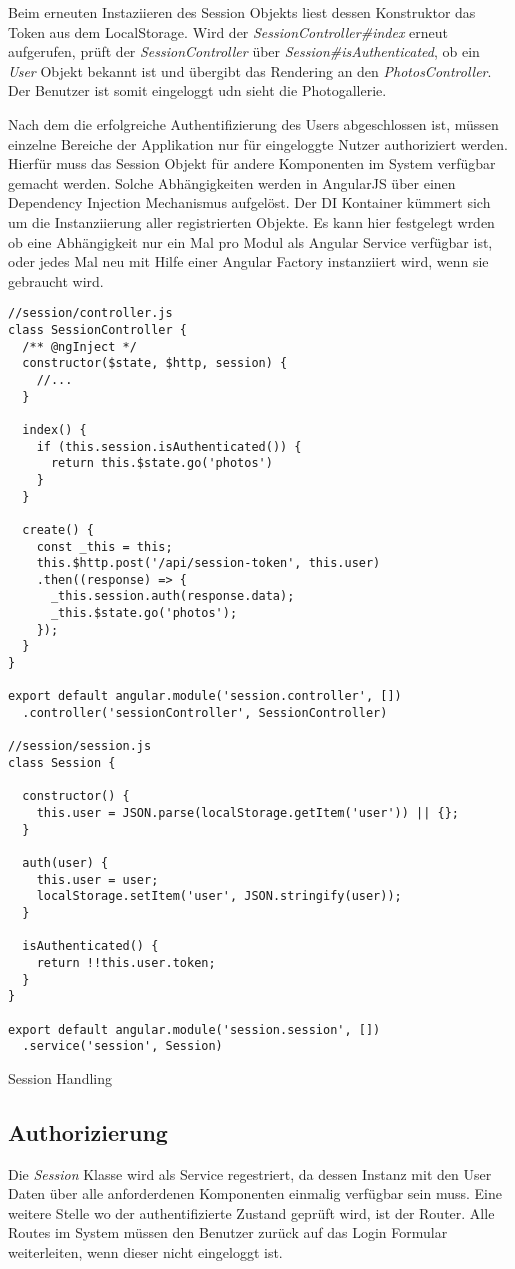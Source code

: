 Beim erneuten Instaziieren des Session Objekts liest dessen Konstruktor das Token aus dem LocalStorage. Wird der \textit{SessionController\#index} erneut aufgerufen, prüft der \textit{SessionController} über \textit{Session\#isAuthenticated}, ob ein \textit{User} Objekt bekannt ist und übergibt das Rendering an den \textit{PhotosController}. Der Benutzer ist somit eingeloggt udn sieht die Photogallerie.

Nach dem die erfolgreiche Authentifizierung des Users abgeschlossen ist, müssen einzelne Bereiche der Applikation nur für eingeloggte Nutzer authoriziert werden. Hierfür muss das Session Objekt für andere Komponenten im System verfügbar gemacht werden. Solche Abhängigkeiten werden in AngularJS über einen \gls{Dependency Injection} Mechanismus aufgelöst. Der DI Kontainer kümmert sich um die Instanziierung aller registrierten Objekte. Es kann hier festgelegt wrden ob eine Abhängigkeit nur ein Mal pro Modul als \gls{Angular Service} verfügbar ist, oder jedes Mal neu mit Hilfe einer \gls{Angular Factory} instanziiert wird, wenn sie gebraucht wird. 


\begin{listing}[H]
\begin{verbatim}
//session/controller.js
class SessionController {
  /** @ngInject */
  constructor($state, $http, session) {
    //...
  }

  index() {
    if (this.session.isAuthenticated()) {
      return this.$state.go('photos')
    }
  }

  create() {
    const _this = this;
    this.$http.post('/api/session-token', this.user)
    .then((response) => {
      _this.session.auth(response.data);
      _this.$state.go('photos');
    });
  }
}

export default angular.module('session.controller', [])
  .controller('sessionController', SessionController)

//session/session.js
class Session {

  constructor() {
    this.user = JSON.parse(localStorage.getItem('user')) || {};
  }

  auth(user) {
    this.user = user;
    localStorage.setItem('user', JSON.stringify(user));
  }

  isAuthenticated() {
    return !!this.user.token;
  }
}

export default angular.module('session.session', [])
  .service('session', Session)

\end{verbatim}
\caption{Session Handling}
\label{lst:session_handling}
\end{listing}

\subsection{Authorizierung}

Die \textit{Session} Klasse wird als Service regestriert, da dessen Instanz mit den User Daten über alle anforderdenen Komponenten einmalig verfügbar sein muss. Eine weitere Stelle wo der authentifizierte Zustand geprüft wird, ist der Router. Alle Routes im System müssen den Benutzer zurück auf das Login Formular weiterleiten, wenn dieser nicht eingeloggt ist.


